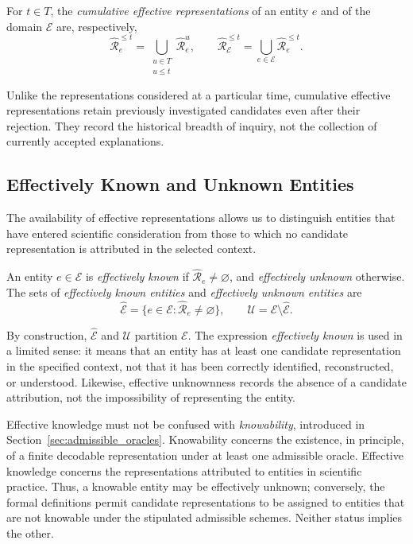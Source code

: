\begin{definition}
\label{def:cumulative_effective_representations}
For $t\in T$, the \emph{cumulative effective representations} of an entity $e$ and of the domain $\mathcal E$ are, respectively,
\[
\hat{\mathcal R}_e^{\leq t}
=\bigcup_{\substack{u\in T\\u\leq t}}\hat{\mathcal R}_e^u,
\qquad
\hat{\mathcal R}_{\mathcal E}^{\leq t}
=\bigcup_{e\in\mathcal E}\hat{\mathcal R}_e^{\leq t}.
\]
\end{definition}

Unlike the representations considered at a particular time, cumulative effective representations retain previously investigated candidates even after their rejection. They record the historical breadth of inquiry, not the collection of currently accepted explanations.

\subsection*{Effectively Known and Unknown Entities}
\label{subsec:known_unknown_entities}

The availability of effective representations allows us to distinguish entities that have entered scientific consideration from those to which no candidate representation is attributed in the selected context.

\begin{definition}
\label{def:unknown_entity}
An entity $e\in\mathcal E$ is \emph{effectively known} if $\hat{\mathcal R}_e\neq\varnothing$, and \emph{effectively unknown} otherwise. The sets of \emph{effectively known entities} and \emph{effectively unknown entities} are
\[
\hat{\mathcal E}
=\{e\in\mathcal E:\hat{\mathcal R}_e\neq\varnothing\},
\qquad
\mathcal U=\mathcal E\setminus\hat{\mathcal E}.
\]
\end{definition}

By construction, $\hat{\mathcal E}$ and $\mathcal U$ partition $\mathcal E$. The expression \emph{effectively known} is used in a limited sense: it means that an entity has at least one candidate representation in the specified context, not that it has been correctly identified, reconstructed, or understood. Likewise, effective unknownness records the absence of a candidate attribution, not the impossibility of representing the entity.

Effective knowledge must not be confused with \emph{knowability}, introduced in Section~\ref{sec:admissible_oracles}. Knowability concerns the existence, in principle, of a finite decodable representation under at least one admissible oracle. Effective knowledge concerns the representations attributed to entities in scientific practice. Thus, a knowable entity may be effectively unknown; conversely, the formal definitions permit candidate representations to be assigned to entities that are not knowable under the stipulated admissible schemes. Neither status implies the other.

